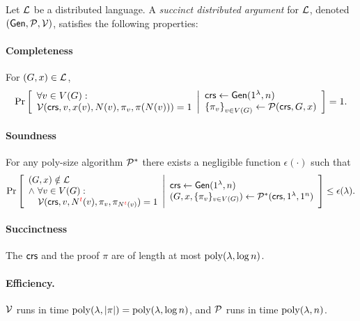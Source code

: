 \begin{definition}\label{defSDarg}
Let $\mathcal{L}$ be a distributed language.
A \emph{succinct distributed argument} for $\mathcal{L}$, %
denoted $(\mathsf{Gen}, \mathcal{P}, \mathcal{V})$, satisfies the following properties:
\vspace{-1ex}
\paragraph{Completeness}  For $(G,x)\in \mathcal{L}$,
\begin{gather*}
    \Pr \left[ \begin{array}{ll} 
    	\forall v \in V(G):\\
	    \mathcal{V}(\mathsf{crs}, v, x(v), N(v), \pi_v, \pi(N(v))) = 1
	 \end{array} \middle\vert \begin{array}{ll} 
    \mathsf{crs} \leftarrow \mathsf{Gen}(1^\lambda, n) \\
    \left \{{ \pi_v } \right \}_{v\in V(G)} \leftarrow \mathcal{P}(\mathit{ \mathsf{crs} }, G, x)
     \end{array} \right]
    = 1
    .
\end{gather*}
\paragraph{Soundness}
For any poly-size algorithm $\mathcal{P}^*$ %
there exists a negligible function $\epsilon(\cdot)$ such that
\begin{gather*}
    \Pr \left[ \begin{array}{ll} 
    (G,x)\notin \mathcal{L} \\
    \wedge\ \forall v\in V(G) :\\
    \quad \mathcal{V}(\mathit{ \mathsf{crs} }, v, N^{\mathbin{\color{red}t}}(v), \pi_v, \pi_{N^{\mathbin{\color{red}t}}(v)} ) = 1
     \end{array} \middle\vert \begin{array}{ll} 
    \mathit{ \mathsf{crs} } \leftarrow \mathsf{Gen}(1^\lambda, n) \\
    ( G, x, \{\pi_v\}_{v\in V(G)}) \leftarrow \mathcal{P}^*(\mathit{ \mathsf{crs} }, 1^\lambda, 1^n)
     \end{array} \right] \leq \epsilon(\lambda)
    .
\end{gather*}
\paragraph{Succinctness} The $\mathsf{crs}$ and the proof $\pi$ are of length at most $\operatorname{poly}(\lambda, \log n)$.

\paragraph{Efficiency.} $\mathcal{V}$ runs in time $\operatorname{poly}(\lambda, |\pi|) = \operatorname{poly}(\lambda, \log n)$,
and $\mathcal{P}$ runs in time $\operatorname{poly}(\lambda, n)$.
\end{definition}
